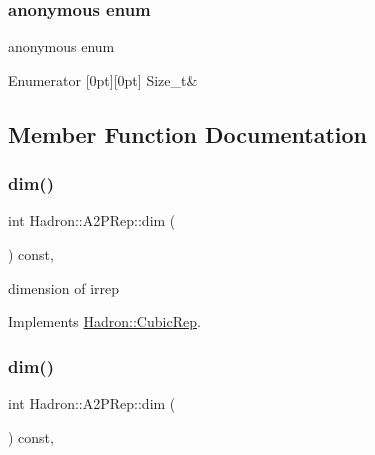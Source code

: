 \subsubsection{\texorpdfstring{anonymous enum}{anonymous enum}}
{\footnotesize\ttfamily anonymous enum}

\begin{DoxyEnumFields}{Enumerator}
[0pt][0pt]{}\mbox{\label{structHadron_1_1A2PRep_a2718300c11a500697f52054758a9ab28ae1efe7e97645fe0900f05f96b945d3f6}} 
Size\+\_\+t&\\
\hline

\end{DoxyEnumFields}


\subsection{Member Function Documentation}
\mbox{\label{structHadron_1_1A2PRep_a04bb56baff4cef639545dcbaa73e8414}} 
\subsubsection{\texorpdfstring{dim()}{dim()}\hspace{0.1cm}{\footnotesize\ttfamily [1/2]}}
{\footnotesize\ttfamily int Hadron\+::\+A2\+P\+Rep\+::dim (\begin{DoxyParamCaption}{ }\end{DoxyParamCaption}) const\hspace{0.3cm}{\ttfamily [inline]}, {\ttfamily [virtual]}}

dimension of irrep 

Implements \mbox{\hyperlink{structHadron_1_1CubicRep_ac178d14064f037a66af4b9fb4b312d51}{Hadron\+::\+Cubic\+Rep}}.

\mbox{\label{structHadron_1_1A2PRep_a04bb56baff4cef639545dcbaa73e8414}} 
\subsubsection{\texorpdfstring{dim()}{dim()}\hspace{0.1cm}{\footnotesize\ttfamily [2/2]}}
{\footnotesize\ttfamily int Hadron\+::\+A2\+P\+Rep\+::dim (\begin{DoxyParamCaption}{ }\end{DoxyParamCaption}) const\hspace{0.3cm}{\ttfamily [inline]}, {\ttfamily [virtual]}}

